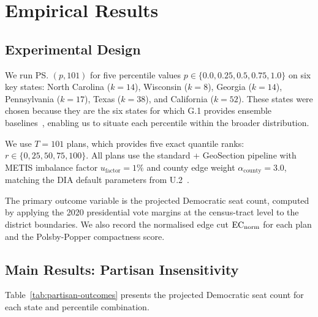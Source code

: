 \section{Empirical Results}
\label{sec:results}

\subsection{Experimental Design}

We run \ps{}$(p, 101)$ for five percentile values $p \in \{0.0, 0.25, 0.5,
0.75, 1.0\}$ on six key states: North Carolina ($k = 14$), Wisconsin ($k = 8$),
Georgia ($k = 14$), Pennsylvania ($k = 17$), Texas ($k = 38$), and
California ($k = 52$).
These states were chosen because they are the six states for which G.1
provides \gc{} ensemble baselines~\citep{g1paper}, enabling us to situate
each percentile within the broader \recom{} distribution.

We use $T = 101$ plans, which provides five exact quantile ranks:
$r \in \{0, 25, 50, 75, 100\}$.
All plans use the standard \ar{} + GeoSection pipeline with METIS imbalance
factor $u_{\mathrm{factor}} = 1\%$ and county edge weight
$\alpha_{\mathrm{county}} = 3.0$, matching the DIA default parameters from
U.2~\citep{b17paper}.

The primary outcome variable is the projected Democratic seat count, computed
by applying the 2020 presidential vote margins at the census-tract level to
the district boundaries.
We also record the normalised edge cut $\mathrm{EC}_{\mathrm{norm}}$ for each plan and the
Polsby-Popper compactness score.

\subsection{Main Results: Partisan Insensitivity}

Table~\ref{tab:partisan-outcomes} presents the projected Democratic seat
count for each state and percentile combination.

